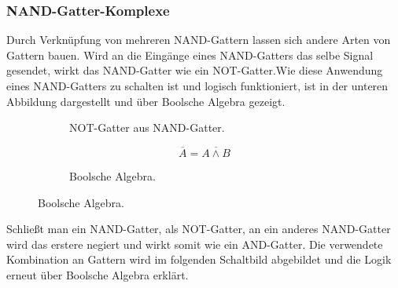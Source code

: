   \subsubsection{NAND-Gatter-Komplexe}
    Durch Verknüpfung von mehreren NAND-Gattern lassen sich andere Arten von Gattern bauen. 
    Wird an die Eingänge eines NAND-Gatters das selbe Signal gesendet, 
    wirkt das NAND-Gatter wie ein NOT-Gatter.Wie diese Anwendung eines NAND-Gatters zu schalten ist und logisch funktioniert, ist in der unteren Abbildung dargestellt und über Boolsche Algebra gezeigt.
       \begin{figure}[H]
       \begin{subfigure}[t]{0.48\textwidth}%
        \centering
        \caption{NOT-Gatter aus NAND-Gatter.\cite{tikz}}
        \vspace{15pt}
      \end{subfigure}
      \hfill
      \begin{subfigure}[t]{0.48\textwidth}
        \centering
        \vspace{0pt}
        \caption{Boolsche Algebra.}
        \begin{equation}
          \overline{A} = \overline{A \wedge B}
        \end{equation}
      \end{subfigure}
    \end{figure}
    \noindent
    Schließt man ein NAND-Gatter, als NOT-Gatter, 
    an ein anderes NAND-Gatter wird das erstere negiert und wirkt somit wie ein AND-Gatter. 
    Die verwendete Kombination an Gattern wird im folgenden Schaltbild abgebildet und die Logik erneut über Boolsche Algebra erklärt.
